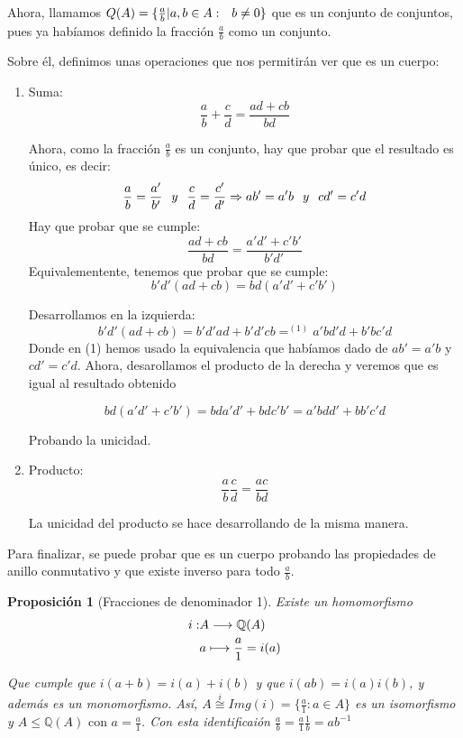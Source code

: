\documentclass[11pt, a4paper, titlepage]{article}
\theoremstyle{theorem-style}
\newtheorem*{nprop}{Proposición}
\theoremstyle{definition-style}
\theoremstyle{remark-style}
\theoremstyle{example-style}
\newenvironment{nlist}
{\begin{enumerate}
\renewcommand\labelenumi{(\emph{\roman{enumi})}}}
{\end{enumerate}}
\begin{document}
Ahora, llamamos $Q(A) = \{\frac{a}{b} | a,b \in A: \hspace{0.25cm} b\neq 0\}$ que es un conjunto de conjuntos, pues ya habíamos definido la fracción $\frac{a}{b}$ como un conjunto.

Sobre él, definimos unas operaciones que nos permitirán ver que es un cuerpo:
\begin{nlist}
	\item Suma: \[\frac{a}{b}+ \frac{c}{d} = \frac{ad + cb}{bd}\]

Ahora, como la fracción $\frac{a}{b}$ es un conjunto, hay que probar que el resultado es único, es decir:
\[
\frac{a}{b}= \frac{a'}{b'} \hspace{0.25cm}y\hspace{0.25cm} \frac{c}{d}= \frac{c'}{d'}  \Rightarrow ab' = a'b \hspace{0.25cm} y \hspace{0.25cm} cd' = c'd
\]
Hay que probar que se cumple:
\[
\frac{ad+cb}{bd} = \frac{a'd'+c'b'}{b'd'}
\]
Equivalementente, tenemos que probar que se cumple:
\[
b'd'(ad+cb) = bd(a'd'+c'b')
\]

Desarrollamos en la izquierda:
\[
b'd'(ad+cb) = b'd'ad + b'd'cb =^{(1)} a'bd'd + b'bc'd
\]
Donde en (1) hemos usado la equivalencia que habíamos dado de $ab' = a'b$ y $cd' = c'd$. Ahora, desarollamos el producto de la derecha y veremos que es igual al resultado obtenido

\[
bd(a'd'+c'b') = bda'd' + bdc'b' = a'bdd' + bb'c'd
\]

Probando la unicidad. 
	
    \item Producto: \[\frac{a}{b} \frac{c}{d} = \frac{ac}{bd}\]

La unicidad del producto se hace desarrollando de la misma manera.
\end{nlist}



Para finalizar, se puede probar que es un cuerpo probando las propiedades de anillo conmutativo y que existe inverso para todo $\frac{a}{b}$.

\begin{nprop}[Fracciones de denominador 1]
  Existe un homomorfismo
  \begin{align}
    i :& A \longrightarrow \mathbb{Q}(A)\notag\\
     \quad  &a \longmapsto \frac{a}{1} = i(a)\notag
  \end{align}

  Que cumple que $i(a+b) = i(a)+i(b)$ y que $i(ab)=i(a)i(b)$, y además es un monomorfismo.
  Así, $A \stackrel{i}{\cong} Img(i) = \{\frac{a}{1} : a\in A\}$ es un isomorfismo y $A\le\mathbb{Q}(A) \text{ con } a=\frac{a}{1}$.
  Con esta identificaión $\frac{a}{b} = \frac{a}{1}\frac{1}{b} = ab^{-1}$
\end{nprop}
\end{document}
